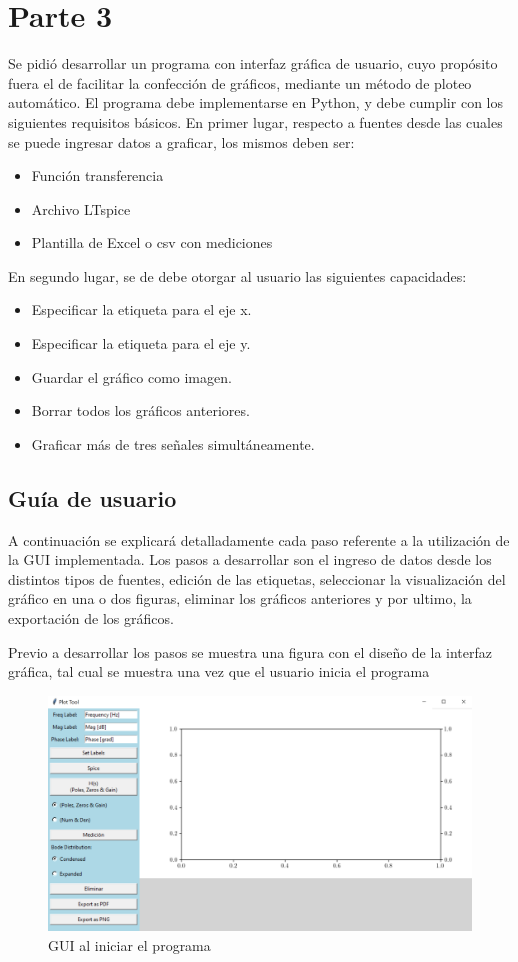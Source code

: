 \documentclass[10pt,a4paper]{article}
\begin{document}
\section{Parte 3}
Se pidió desarrollar un programa con interfaz gráfica de usuario, cuyo propósito fuera el de facilitar la confección de gráficos, mediante un método de ploteo automático. El programa debe implementarse en Python, y debe cumplir con los siguientes requisitos básicos. 
En primer lugar, respecto a fuentes desde las cuales se puede ingresar datos a graficar, los mismos deben ser:
\begin{itemize}
\item Función transferencia
\item Archivo LTspice
\item Plantilla de Excel o csv con mediciones
\end{itemize}
En segundo lugar, se de debe otorgar al usuario las siguientes capacidades:
\begin{itemize}
\item Especificar la etiqueta para el eje x.
\item Especificar la etiqueta para el eje y.
\item Guardar el gráfico como imagen.
\item Borrar todos los gráficos anteriores.
\item Graficar más de tres señales simultáneamente.
\end{itemize}

\subsection{Guía de usuario}
A continuación se explicará detalladamente cada paso referente a la utilización de la GUI implementada. Los pasos a desarrollar son el ingreso de datos desde los distintos tipos de fuentes, edición de las etiquetas, seleccionar la visualización del gráfico en una o dos figuras, eliminar los gráficos anteriores y por ultimo, la exportación de los gráficos.

Previo a desarrollar los pasos se muestra una figura con el diseño de la interfaz gráfica, tal cual se muestra una vez que el usuario inicia el programa

\begin{figure}[ht]
\centering
\includegraphics[scale=0.2]{resources/window.png}
\caption{GUI al iniciar el programa}
\label{fig:window}
\end{figure}
\end{document}

